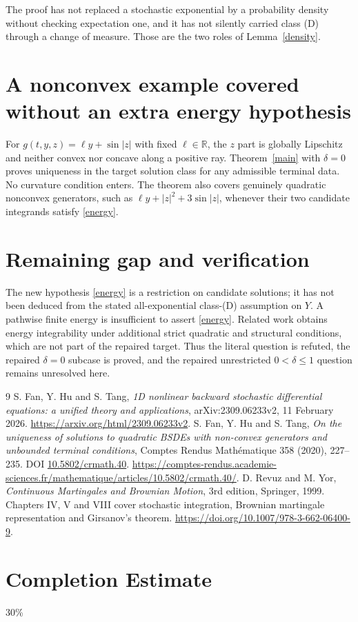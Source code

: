 \documentclass[11pt]{article}
\newcommand{\R}{\mathbb R}
\begin{document}
The proof has not replaced a stochastic exponential by a probability
density without checking expectation one, and it has not silently carried
class (D) through a change of measure. Those are the two roles of
Lemma~\ref{density}.

\section{A nonconvex example covered without an extra energy hypothesis}
For $g(t,y,z)=\ell y+\sin|z|$ with fixed $\ell\in\R$, the $z$ part
is globally Lipschitz and neither convex nor concave along a positive ray.
Theorem~\ref{main} with $\delta=0$ proves uniqueness in the target solution
class for any admissible terminal data. No curvature condition enters.
The theorem also covers genuinely quadratic nonconvex generators, such as
$\ell y+|z|^2+3\sin|z|$, whenever their two candidate integrands satisfy
\eqref{energy}.

\section{Remaining gap and verification}
The new hypothesis \eqref{energy} is a restriction on candidate solutions;
it has not been deduced from the stated all-exponential class-(D)
assumption on $Y$. A pathwise finite energy is insufficient to assert
\eqref{energy}. Related work \cite{FHT20} obtains energy integrability
under additional strict quadratic and structural conditions, which are not
part of the repaired target. Thus the literal question is refuted, the
repaired $\delta=0$ subcase is proved, and the repaired unrestricted
$0<\delta\leq1$ question remains unresolved here.

\begin{thebibliography}{9}
 S. Fan, Y. Hu and S. Tang,
\emph{1D nonlinear backward stochastic differential equations: a unified theory and applications}, arXiv:2309.06233v2, 11 February 2026.
\url{https://arxiv.org/html/2309.06233v2}.
 S. Fan, Y. Hu and S. Tang,
\emph{On the uniqueness of solutions to quadratic BSDEs with non-convex generators
and unbounded terminal conditions}, Comptes Rendus Math\'ematique 358 (2020),
227--235. DOI \href{https://doi.org/10.5802/crmath.40}{10.5802/crmath.40}.
\url{https://comptes-rendus.academie-sciences.fr/mathematique/articles/10.5802/crmath.40/}.
 D. Revuz and M. Yor, \emph{Continuous Martingales and Brownian Motion},
3rd edition, Springer, 1999. Chapters IV, V and VIII cover stochastic
integration, Brownian martingale representation and Girsanov's theorem.
\url{https://doi.org/10.1007/978-3-662-06400-9}.
\end{thebibliography}
\section{Completion Estimate}
30\%
\end{document}
